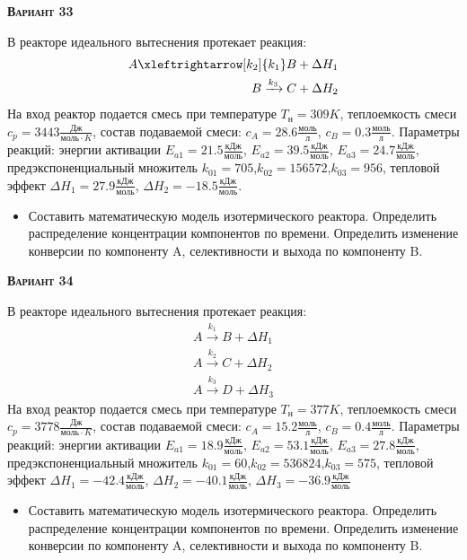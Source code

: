 \textsc{\textbf{Вариант 33}}

 В реакторе идеального вытеснения протекает реакция: \begin{equation*} \begin{aligned} A \xleftrightarrow[k_2]{k_1} B + \Delta H_1 \\ B \xrightarrow{k_3} C + \Delta H_2 \end{aligned} \end{equation*}                              На вход  реактор подается смесь при температуре $ T_{н} =  309 K$, теплоемкость смеси $c_p= 3443 \frac{Дж}{моль \cdot K}$, состав подаваемой смеси: $c_A=28.6 \frac{моль}{л}$, $c_B=0.3 \frac{моль}{л}$. Параметры реакций: энергии активации $E_{a1}=21.5 \frac{кДж}{моль}$, $E_{a2}=39.5  \frac{кДж}{моль}$, $E_{a3}=24.7  \frac{кДж}{моль}$, предэкспоненциальный множитель $k_{01}=       705$,$k_{02}=    156572$,$k_{03}=       956$, тепловой эффект $\Delta H_1= 27.9  \frac{кДж}{моль}$, $\Delta H_2=-18.5 \frac{кДж}{моль}$.\begin{itemize} \item Составить математическую модель изотермического реактора. Определить распределение концентрации компонентов по времени. Определить изменение конверсии по компоненту A, селективности и выхода по компоненту B. \end{itemize}

\textsc{\textbf{Вариант 34}}

 В реакторе идеального вытеснения протекает реакция: \begin{equation*} \begin{aligned} A \xrightarrow{k_1} B + \Delta H_1 \\ A \xrightarrow{k_2} C + \Delta H_2 \\ A \xrightarrow{k_3} D + \Delta H_3 \end{aligned} \end{equation*} На вход  реактор подается смесь при температуре $ T_{н} =  377 K$, теплоемкость смеси $c_p= 3778 \frac{Дж}{моль \cdot K}$, состав подаваемой смеси: $c_A=15.2 \frac{моль}{л}$, $c_B=0.4 \frac{моль}{л}$. Параметры реакций: энергии активации $E_{a1}=18.9 \frac{кДж}{моль}$, $E_{a2}=53.1  \frac{кДж}{моль}$, $E_{a3}=27.8  \frac{кДж}{моль}$, предэкспоненциальный множитель $k_{01}=        60$,$k_{02}=    536824$,$k_{03}=       575$, тепловой эффект $\Delta H_1= -42.4 \frac{кДж}{моль}$, $\Delta H_2=-40.1 \frac{кДж}{моль}$, $\Delta H_3 = -36.9 \frac{кДж}{моль}$\begin{itemize} \item Составить математическую модель изотермического реактора. Определить распределение концентрации компонентов по времени. Определить изменение конверсии по компоненту A, селективности и выхода по компоненту B. \end{itemize}

